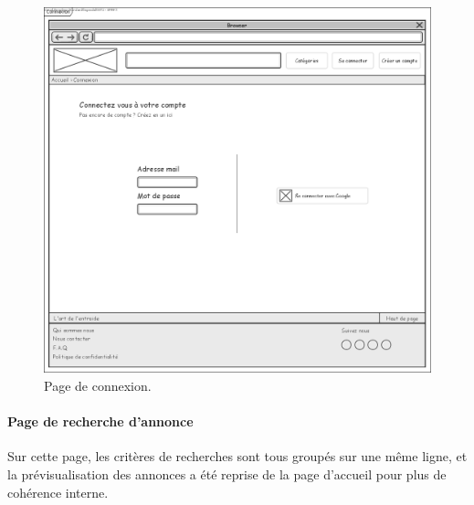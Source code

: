 \documentclass[a4paper,11pt]{article}
\begin{document}
\begin{figure}[H]
  \includegraphics[width=\linewidth]{../Conception/maquette/maquette-connexion.png}
  \caption{Page de connexion.}
  \label{fig:maquette-connexion}
\end{figure}
\newpage

\paragraph{Page de recherche d'annonce}

Sur cette page, les critères de recherches sont tous groupés sur une même ligne,
et la prévisualisation des annonces a été reprise de la page d'accueil pour plus de cohérence interne.
\end{document}
